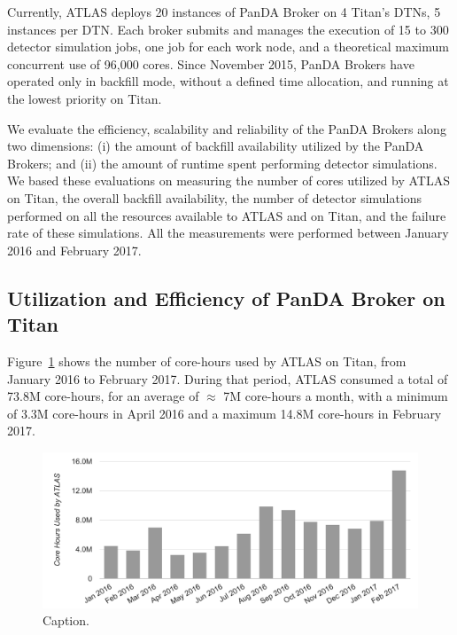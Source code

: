 Currently, ATLAS deploys 20 instances of PanDA Broker on 4 Titan's DTNs, 5
instances per DTN. Each broker submits and manages the execution of 15 to 300
detector simulation jobs, one job for each work node, and a theoretical maximum
concurrent use of 96,000 cores. Since November 2015, PanDA Brokers have operated
only in backfill mode, without a defined time allocation, and running at the
lowest priority on Titan.

We evaluate the efficiency, scalability and reliability of the PanDA Brokers
along two dimensions: (i) the amount of backfill availability utilized by the
PanDA Brokers; and (ii) the amount of %
runtime spent performing detector simulations.  We based these evaluations on measuring the number
of cores utilized by ATLAS on Titan, the overall backfill availability, the
number of detector simulations performed on all the resources available to ATLAS
and on Titan, and the failure rate of these simulations. All the measurements
were performed between January 2016 and February 2017.

\subsection{Utilization and Efficiency of PanDA Broker on Titan}
\label{ssec:panda_titan}

Figure~\ref{fig:core-hours-utilization} shows the number of core-hours used by
ATLAS on Titan, from January 2016 to February 2017. During that period, ATLAS
consumed a total of 73.8M core-hours, for an average of $\approx$ 7M core-hours a month,
with a minimum of 3.3M core-hours in April 2016 and a maximum 14.8M core-hours
in February 2017.

%

\begin{figure}[htp]
\includegraphics[clip,width=\columnwidth]{figures/cpu_hours.png}
\caption{Caption.}
\label{fig:core-hours-utilization}
\end{figure}

